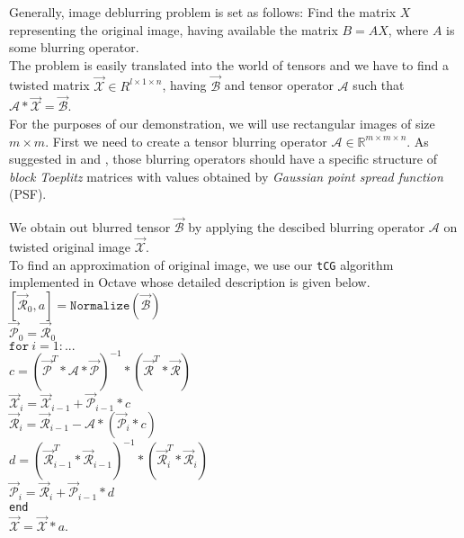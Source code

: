 \documentclass[twoside]{article}
\newcommand{\code}[1]{\texttt{#1}}
\begin{document}
\begin{multicols}{2}
Generally, image deblurring problem is set as follows: Find the matrix $X$ representing the original image, having available the matrix $B = A X$, where $A$ is some blurring operator.\\
The problem is easily translated into the world of tensors and we have to find a twisted matrix $\overrightarrow{\mathcal{X}} \in R^{l \times 1 \times n}$, having $\overrightarrow{\mathcal{B}}$ and tensor operator $\mathcal{A}$ such that $\mathcal{A} \ast \overrightarrow{\mathcal{X}} = \overrightarrow{\mathcal{B}}$.\\

For the purposes of our demonstration, we will use rectangular images of size $m \times m$. First we need to create a tensor blurring operator $\mathcal{A} \in \mathbb{R}^{m \times m \times n}$. As suggested in \cite{kilmer-braman-hao} and \cite{kilmer-martin}, those blurring operators should have a specific structure of \textit{block Toeplitz} matrices with values obtained by \textit{Gaussian point spread function} (PSF).

We obtain out blurred tensor $\overrightarrow{\mathcal{B}}$ by applying the descibed blurring operator $\mathcal{A}$ on twisted original image $\overrightarrow{\mathcal{X}}$.\\

To find an approximation of original image, we use our \code{tCG} algorithm implemented in Octave whose detailed description is given below.\\

\noindent $[\overrightarrow{\mathcal{R}}_0,a] = \code{Normalize}(\overrightarrow{\mathcal{B}})$\\
$\overrightarrow{\mathcal{P}}_0 = \overrightarrow{\mathcal{R}}_0$\\
$\code{for}\ i=1:...$\\
\indent $c = (\overrightarrow{\mathcal{P}}^T \ast \mathcal{A} \ast \overrightarrow{\mathcal{P}})^{-1} \ast (\overrightarrow{\mathcal{R}}^T \ast \overrightarrow{\mathcal{R}})$\\
\indent $\overrightarrow{\mathcal{X}}_i = \overrightarrow{\mathcal{X}}_{i-1} + \overrightarrow{\mathcal{P}}_{i-1} \ast c$\\
\indent $\overrightarrow{\mathcal{R}}_i = \overrightarrow{\mathcal{R}}_{i-1} - \mathcal{A} \ast (\overrightarrow{\mathcal{P}}_i \ast c)$\\
\indent $d = (\overrightarrow{\mathcal{R}}^T_{i-1} \ast \overrightarrow{\mathcal{R}}_{i-1})^{-1} \ast (\overrightarrow{\mathcal{R}}^T_i \ast \overrightarrow{\mathcal{R}}_i)$\\
\indent $\overrightarrow{\mathcal{P}}_i = \overrightarrow{\mathcal{R}}_i + \overrightarrow{\mathcal{P}}_{i-1} \ast d$\\
\code{end}\\
$\overrightarrow{\mathcal{X}} = \overrightarrow{\mathcal{X}} \ast a$.\\


\end{multicols}
\end{document}
